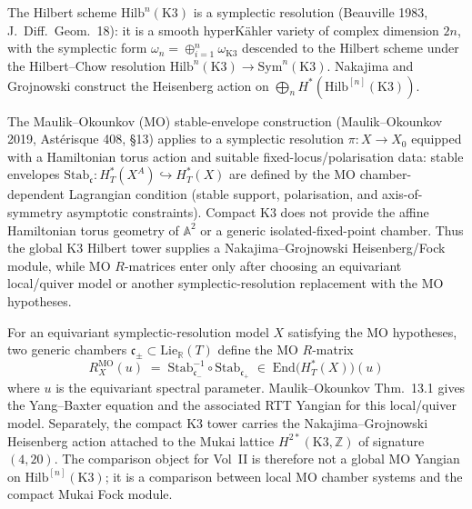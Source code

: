 \begin{remark}
\label{rem:msco-K3-hilb-symplectic}
The Hilbert scheme $\mathrm{Hilb}^n(\mathrm{K3})$ is a symplectic
resolution (Beauville 1983, J.~Diff.~Geom.~18): it is a smooth
hyperK\"ahler variety of complex dimension $2n$, with the symplectic
form $\omega_n = \oplus_{i=1}^n \omega_{\mathrm K3}$ descended to the
Hilbert scheme under the Hilbert--Chow resolution
$\mathrm{Hilb}^n(\mathrm{K3}) \to \mathrm{Sym}^n(\mathrm{K3})$.
Nakajima and Grojnowski construct the Heisenberg action on
$\bigoplus_n H^*(\mathrm{Hilb}^{[n]}(\mathrm K3))$.

The Maulik--Okounkov (MO) stable-envelope construction
(Maulik--Okounkov 2019, Ast\'erisque 408, \S13) applies to a
symplectic resolution $\pi\colon X\to X_0$ equipped with a
Hamiltonian torus action and suitable fixed-locus/polarisation data:
stable envelopes
$\mathrm{Stab}_\mathfrak{c}\colon H^*_T(X^A) \hookrightarrow H^*_T(X)$
are defined by the MO chamber-dependent Lagrangian condition (stable
support, polarisation, and axis-of-symmetry asymptotic constraints).
Compact $\mathrm{K3}$ does not provide the affine Hamiltonian torus
geometry of $\mathbb A^2$ or a generic isolated-fixed-point chamber.
Thus the global K3 Hilbert tower supplies a Nakajima--Grojnowski
Heisenberg/Fock module, while MO $R$-matrices enter only after choosing
an equivariant local/quiver model or another symplectic-resolution
replacement with the MO hypotheses.
\end{remark}

\begin{remark}
\label{rem:msco-K3-hilb-MO-yangian}
For an equivariant symplectic-resolution model $X$ satisfying the MO
hypotheses, two generic chambers
$\mathfrak{c}_\pm \subset \mathrm{Lie}_{\mathbb R}(T)$ define the MO
$R$-matrix
\[
R^{\mathrm{MO}}_X(u) \;=\;
\mathrm{Stab}_{\mathfrak{c}_-}^{-1} \circ
\mathrm{Stab}_{\mathfrak{c}_+} \;\in\;
\mathrm{End}\bigl(H^*_T(X)\bigr)(u)
\]
where $u$ is the equivariant spectral parameter. Maulik--Okounkov
Thm.~13.1 gives the Yang--Baxter equation and the associated RTT
Yangian for this local/quiver model. Separately, the compact K3 tower
carries the Nakajima--Grojnowski Heisenberg action attached to the
Mukai lattice $H^{2*}(\mathrm{K3},\mathbb Z)$ of signature $(4,20)$.
The comparison object for Vol~II is therefore not a global MO Yangian
on $\mathrm{Hilb}^{[n]}(\mathrm K3)$; it is a comparison between local
MO chamber systems and the compact Mukai Fock module.
\end{remark}

